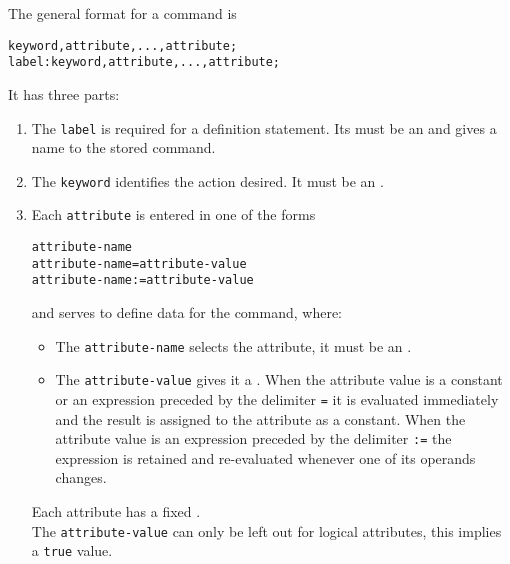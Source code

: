 The general format for a command is
\begin{verbatim}
keyword,attribute,...,attribute;
label:keyword,attribute,...,attribute;
\end{verbatim}
It has three parts:
\begin{enumerate}
\item The \texttt{label} is required for a definition statement.
  Its must be an  and gives a name to the
  stored command. 
\item The \texttt{keyword} identifies the action desired.
  It must be an .
\item Each \texttt{attribute} is entered in one of the forms
\begin{verbatim}
attribute-name
attribute-name=attribute-value
attribute-name:=attribute-value
\end{verbatim}
and serves to define data for the command, where:
\begin{itemize}
\item The \texttt{attribute-name} selects the attribute,
  it must be an .
\item The \texttt{attribute-value} gives it a .
  When the attribute value is a constant or an expression preceded by
  the delimiter \texttt{=} it is evaluated immediately and the result
  is assigned to the attribute as a constant.
  When the attribute value is an expression preceded by the delimiter
  \texttt{:=} the expression is retained and re-evaluated whenever one
  of its operands changes.
\end{itemize}
Each attribute has a fixed .\\
The \texttt{attribute-value} can only be left out for logical
attributes, this implies a \texttt{true} value.
\end{enumerate}

